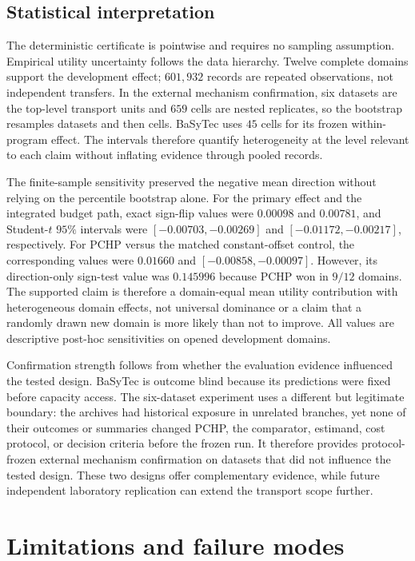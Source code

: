 \documentclass[preprint,12pt]{elsarticle}
\begin{document}
\subsection{Statistical interpretation}

The deterministic certificate is pointwise and requires no sampling assumption. Empirical utility uncertainty follows the data hierarchy. Twelve complete domains support the development effect; $601{,}932$ records are repeated observations, not independent transfers. In the external mechanism confirmation, six datasets are the top-level transport units and $659$ cells are nested replicates, so the bootstrap resamples datasets and then cells. BaSyTec uses $45$ cells for its frozen within-program effect. The intervals therefore quantify heterogeneity at the level relevant to each claim without inflating evidence through pooled records.

The finite-sample sensitivity preserved the negative mean direction without relying on the percentile bootstrap alone. For the primary effect and the integrated budget path, exact sign-flip values were $0.00098$ and $0.00781$, and Student-$t$ $95\%$ intervals were $[-0.00703,-0.00269]$ and $[-0.01172,-0.00217]$, respectively. For PCHP versus the matched constant-offset control, the corresponding values were $0.01660$ and $[-0.00858,-0.00097]$. However, its direction-only sign-test value was $0.145996$ because PCHP won in $9/12$ domains. The supported claim is therefore a domain-equal mean utility contribution with heterogeneous domain effects, not universal dominance or a claim that a randomly drawn new domain is more likely than not to improve. All values are descriptive post-hoc sensitivities on opened development domains.

Confirmation strength follows from whether the evaluation evidence influenced the tested design. BaSyTec is outcome blind because its predictions were fixed before capacity access. The six-dataset experiment uses a different but legitimate boundary: the archives had historical exposure in unrelated branches, yet none of their outcomes or summaries changed PCHP, the comparator, estimand, cost protocol, or decision criteria before the frozen run. It therefore provides protocol-frozen external mechanism confirmation on datasets that did not influence the tested design. These two designs offer complementary evidence, while future independent laboratory replication can extend the transport scope further.

\section{Limitations and failure modes}
\end{document}
